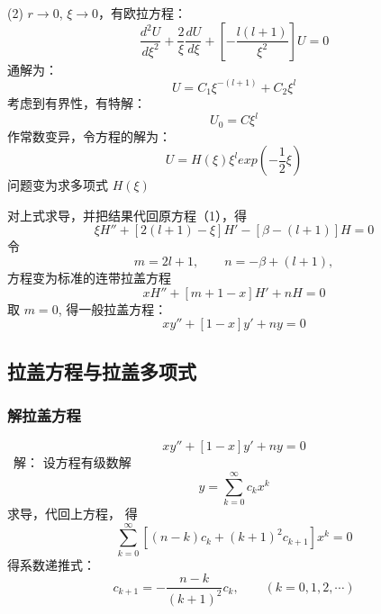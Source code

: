 \begin{frame}
	(2) $r\to 0$, $\xi \to 0$，有欧拉方程：
	\begin{equation*}
		\frac{d^2 U}{d \xi ^2} + \frac{2}{\xi }\frac{d U }{d \xi}  +[ - \frac{l(l+1)}{\xi ^2}] U=0
	\end{equation*}	 
	通解为：
	\begin{equation*}
		U=C_1 \xi ^{-(l+1)}+C_2 \xi ^ l 
	\end{equation*}	
	考虑到有界性，有特解：
	\begin{equation*}
		U_0=C  \xi ^ l 
	\end{equation*}	
	作常数变异，令方程的解为：
	\begin{equation*}
		U=H(\xi)  \xi ^ l  exp(-\frac{1}{2}\xi ) 
	\end{equation*}	
	问题变为求多项式 $H(\xi)$
\end{frame}	

\begin{frame}
	对上式求导，并把结果代回原方程（1），得
	\begin{equation*}
		\xi H''  + [2(l+1) -\xi] H' -[\beta -(l+1)] H =0
	\end{equation*}	
	令
	\begin{equation*}
		m=2l+1, \qquad n=-\beta+(l+1), 
	\end{equation*}	
	方程变为标准的连带拉盖方程
	\begin{equation*}
		\boxed{x H''  + [m+1 -x] H' +n H =0}
	\end{equation*}	
	取 $m=0$, 得一般拉盖方程：
	\begin{equation*}
		\boxed{x y''  + [1 -x] y' +n y =0}
	\end{equation*}	
\end{frame}	

\subsection{拉盖方程与拉盖多项式}

\begin{frame}
	\frametitle{解拉盖方程}
	\begin{equation*}
		\boxed{x y''  + [1 -x] y' +n y =0}
	\end{equation*}	
	\alert{ 解：} 设方程有级数解
	\begin{equation*}
		y=\sum_{k=0}^{\infty} c_k x^k
	\end{equation*}	
	求导，代回上方程， 得 
	\begin{equation*}
		\sum_{k=0}^{\infty} [(n-k)c_k +(k+1)^2 c_{k+1}  ] x^k =0
	\end{equation*}	
	得系数递推式：
	\begin{equation*}
		c_{k+1}=-\frac{n-k}{(k+1)^2} c_k, \qquad (k=0,1,2,\cdots)
	\end{equation*}	
\end{frame}	

